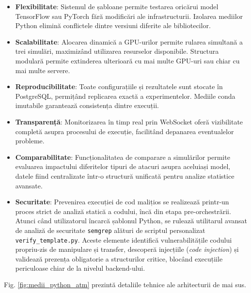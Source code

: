 \documentclass[../../main.tex]{subfiles}
\begin{document}
    \begin{itemize}
        \item \textbf{Flexibilitate}: Sistemul de șabloane permite testarea oricărui model TensorFlow sau PyTorch fără modificări ale infrastructurii. Izolarea mediilor Python elimină conflictele dintre versiuni diferite ale bibliotecilor.
        
        \item \textbf{Scalabilitate}: Alocarea dinamică a GPU-urilor permite rularea simultană a trei simulări, maximizând utilizarea resurselor disponibile. Structura modulară permite extinderea ulterioară cu mai multe GPU-uri sau chiar cu mai multe servere.
        
        \item \textbf{Reproducibilitate}: Toate configurațiile și rezultatele sunt stocate în PostgreSQL, permițând replicarea exactă a experimentelor. Mediile conda imutabile garantează consistența dintre execuții.
        
        \item \textbf{Transparență}: Monitorizarea în timp real prin WebSocket oferă vizibilitate completă asupra procesului de execuție, facilitând depanarea eventualelor probleme.
        
        \item \textbf{Comparabilitate}: Funcționalitatea de comparare a simulărilor permite evaluarea impactului diferitelor tipuri de atacuri asupra aceluiași model, datele fiind centralizate într-o structură unificată pentru analize statistice avansate.
        
        \item \textbf{Securitate}: Prevenirea execuției de cod malițios se realizează printr-un proces strict de analiză statică a codului, încă din etapa pre-orchestrării. Atunci când utilizatorul încarcă șablonul Python, se rulează utilitarul avansat de analiză de securitate \texttt{semgrep} alături de scriptul personalizat \texttt{verify\-\_template.py}. Aceste elemente identifică vulnerabilitățile codului propriu-zis de manipulare și transfer, descoperă injecțiile (\textit{code injection}) și validează prezența obligatorie a structurilor critice, blocând execuțiile periculoase chiar de la nivelul backend-ului.
    \end{itemize}
    
    
    
	Fig. \ref{fig:medii_python_atm} prezintă detaliile tehnice ale arhitecturii de mai sus.
\end{document}
